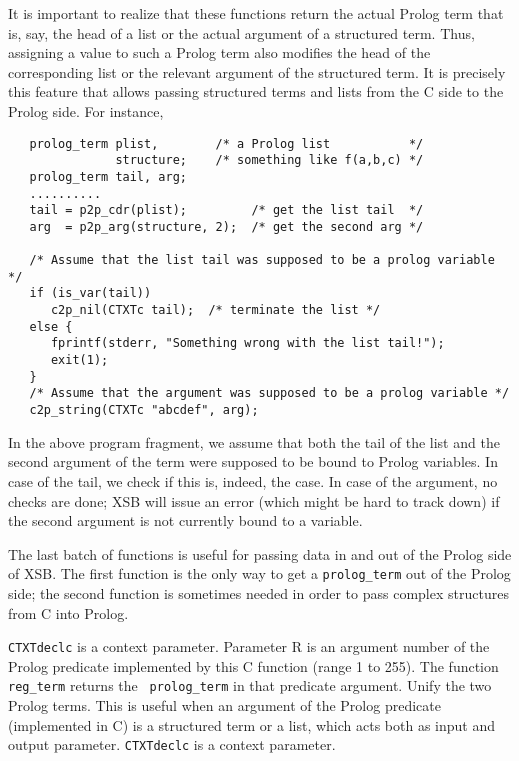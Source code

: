 It is important to realize that these functions return the actual
Prolog term that is, say, the head of a list or the actual argument of
a structured term. Thus, assigning a value to such a Prolog term also
modifies the head of the corresponding list or the relevant argument
of the structured term. It is precisely this feature that allows
passing structured terms and lists from the C side to the Prolog side.
For instance,
\begin{verbatim}
   prolog_term plist,        /* a Prolog list           */
               structure;    /* something like f(a,b,c) */
   prolog_term tail, arg;
   ..........
   tail = p2p_cdr(plist);         /* get the list tail  */
   arg  = p2p_arg(structure, 2);  /* get the second arg */

   /* Assume that the list tail was supposed to be a prolog variable */
   if (is_var(tail))
      c2p_nil(CTXTc tail);  /* terminate the list */
   else {
      fprintf(stderr, "Something wrong with the list tail!");
      exit(1);
   }
   /* Assume that the argument was supposed to be a prolog variable */
   c2p_string(CTXTc "abcdef", arg);
\end{verbatim}

In the above program fragment, we assume that both the tail of the list and
the second argument of the term were supposed to be bound to Prolog variables.
In case of the tail, we check if this is, indeed, the case. In case of the
argument, no checks are done; XSB will issue an error (which might be hard
to track down) if the second argument is not currently bound to a variable.

The last batch of functions is useful for passing data in and out of the
Prolog side of XSB. The first function is the only way to get a
{\tt prolog\_term} out of the Prolog side; the second function is
sometimes needed in order to pass complex structures from C into Prolog.
\begin{description}
%
  {\tt CTXTdeclc} is a context parameter.  Parameter R is an argument
  number of the Prolog predicate implemented by this C function (range
  1 to 255). The function {\tt reg\_term} returns the {\tt
    prolog\_term} in that predicate argument.
% 
%
Unify the two Prolog terms. This is useful when an argument of the
Prolog predicate (implemented in C) is a structured term or a list,
which acts both as input and output parameter.  {\tt CTXTdeclc} is a
context parameter.
\end{description}

